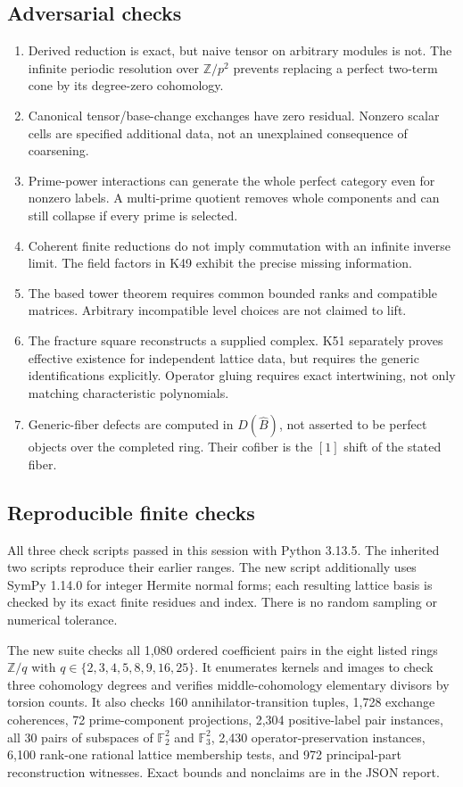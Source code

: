 \documentclass[11pt]{article}
\theoremstyle{definition}
\theoremstyle{remark}
\begin{document}
\subsection{Adversarial checks}
\begin{enumerate}
\item Derived reduction is exact, but naive tensor on arbitrary modules is not. The infinite periodic resolution over $\mathbb Z/p^2$ prevents replacing a perfect two-term cone by its degree-zero cohomology.
\item Canonical tensor/base-change exchanges have zero residual. Nonzero scalar cells are specified additional data, not an unexplained consequence of coarsening.
\item Prime-power interactions can generate the whole perfect category even for nonzero labels. A multi-prime quotient removes whole components and can still collapse if every prime is selected.
\item Coherent finite reductions do not imply commutation with an infinite inverse limit. The field factors in K49 exhibit the precise missing information.
\item The based tower theorem requires common bounded ranks and compatible matrices. Arbitrary incompatible level choices are not claimed to lift.
\item The fracture square reconstructs a supplied complex. K51 separately proves effective existence for independent lattice data, but requires the generic identifications explicitly. Operator gluing requires exact intertwining, not only matching characteristic polynomials.
\item Generic-fiber defects are computed in $D(\widehat B)$, not asserted to be perfect objects over the completed ring. Their cofiber is the $[1]$ shift of the stated fiber.
\end{enumerate}

\subsection{Reproducible finite checks}
All three check scripts passed in this session with Python 3.13.5. The inherited two scripts reproduce their earlier ranges. The new script additionally uses SymPy 1.14.0 for integer Hermite normal forms; each resulting lattice basis is checked by its exact finite residues and index. There is no random sampling or numerical tolerance.

The new suite checks all 1,080 ordered coefficient pairs in the eight listed rings $\mathbb Z/q$ with $q\in\{2,3,4,5,8,9,16,25\}$. It enumerates kernels and images to check three cohomology degrees and verifies middle-cohomology elementary divisors by torsion counts. It also checks 160 annihilator-transition tuples, 1,728 exchange coherences, 72 prime-component projections, 2,304 positive-label pair instances, all 30 pairs of subspaces of $\mathbb F_2^2$ and $\mathbb F_3^2$, 2,430 operator-preservation instances, 6,100 rank-one rational lattice membership tests, and 972 principal-part reconstruction witnesses. Exact bounds and nonclaims are in the JSON report.
\end{document}
